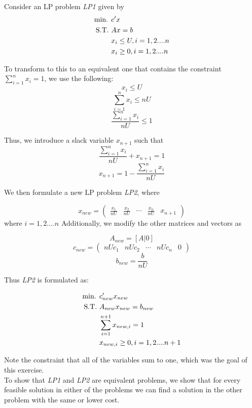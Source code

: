 Consider an LP problem \textit{LP1} given by
\begin{align}
    \text{min. } &c'x \notag\\
    \text{S.T. } &Ax = b \notag\\
    &x_i \le U, i = 1,2....n \notag\\
    &x_i \ge 0, i = 1,2....n \notag\\
\end{align}

To transform to this to an equivalent one that contains the constraint $\sum_{i=1}^{n}x_i = 1$, we use the following: 
\[ x_i \le U\]
\[ \sum_{i=1}^{n}x_i \le nU \]
\[ \frac{\sum_{i=1}^{n}x_i}{nU} \le 1\]

Thus, we introduce a slack variable $x_{n+1}$ such that
\[ \frac{\sum_{i=1}^{n}x_i}{nU} + x_{n+1} = 1\]
\[ x_{n+1}=1-\frac{\sum_{i=1}^{n}x_i}{nU}\]

We then formulate a new LP problem \textit{LP2}, where

\[ x_{new} = \begin{pmatrix}\frac{x_1}{nU} & \frac{x_2}{nU}&\cdots & \frac{x_n}{nU} & x_{n+1}\end{pmatrix}\]
where $i=1,2....n$
Additionally, we modify the other matrices and vectors as 

\[ A_{new} = [A | 0]\]
\[ c_{new} = \begin{pmatrix}nUc_1 & nUc_2 & \cdots & nUc_n & 0\end{pmatrix}\]
\[ b_{new} = \frac{b}{nU}\]

Thus \textit{LP2} is formulated as:


\begin{align}
    \text{min. } &c_{new}'x_{new} \notag\\
    \text{S.T. } &A_{new}x_{new} = b_{new} \notag\\
    &\sum_{i=1}^{n+1}x_{new,i} = 1 \notag \\
    &x_{new,i} \ge 0, i = 1,2....n+1 \notag\\
\end{align}

Note the constraint that all of the variables sum to one, which was the goal of this exercise.\\

To show that \textit{LP1} and \textit{LP2} are equivalent problems, we show that for every feasible solution in either of the problems we can find a solution in the other problem with the same or lower cost.\\

